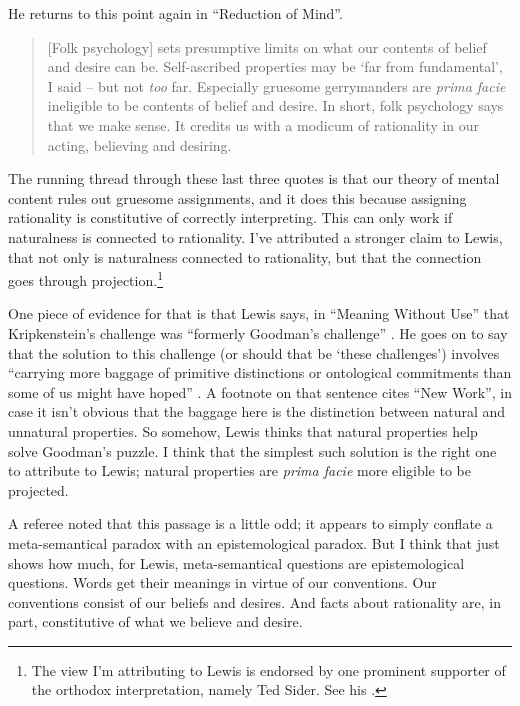 \noindent He returns to this point again in ``Reduction of Mind''.

\begin{quote}
[Folk psychology] sets presumptive limits on what our contents of belief and desire can be. Self-ascribed properties may be `far from fundamental', I said -- but not \textit{too} far. Especially gruesome gerrymanders are \textit{prima facie} ineligible to be contents of belief and desire. In short, folk psychology says that we make sense. It credits us with a modicum of rationality in our acting, believing and desiring. \citep[320 in reprint]{Lewis1994b}
\end{quote}

\noindent The running thread through these last three quotes is that our theory of mental content rules out gruesome assignments, and it does this because assigning rationality is constitutive of correctly interpreting. This can only work if naturalness is connected to rationality. I've attributed a stronger claim to Lewis, that not only is naturalness connected to rationality, but that the connection goes through projection.\footnote{The view I'm attributing to Lewis is endorsed by one prominent supporter of the orthodox interpretation, namely Ted Sider. See his \citeyearpar[35ff]{Sider2012}.} 

One piece of evidence for that is that Lewis says, in ``Meaning Without Use'' that Kripkenstein's challenge was ``formerly Goodman's challenge'' \citep[109]{Lewis1992a}. He goes on to say that the solution to this challenge (or should that be `these challenges') involves ``carrying more baggage of primitive distinctions or ontological commitments than some of us might have hoped'' \citep[110]{Lewis1992a}. A footnote on that sentence cites ``New Work'', in case it isn't obvious that the baggage here is the distinction between natural and unnatural properties. So somehow, Lewis thinks that natural properties help solve Goodman's puzzle. I think that the simplest such solution is the right one to attribute to Lewis; natural properties are \textit{prima facie} more eligible to be projected.

A referee noted that this passage is a little odd; it appears to simply conflate a meta-semantical paradox with an epistemological paradox. But I think that just shows how much, for Lewis, meta-semantical questions are epistemological questions. Words get their meanings in virtue of our conventions. Our conventions consist of our beliefs and desires. And facts about rationality are, in part, constitutive of what we believe and desire.

